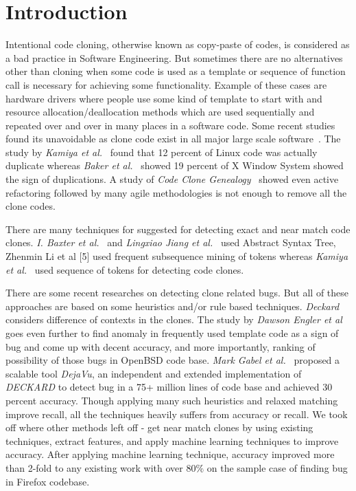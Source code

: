 \documentclass[nocopyrightspace]{sigplanconf}
\begin{document}
\section{Introduction}
Intentional code cloning, otherwise known as copy-paste of codes, is considered as a bad practice in Software Engineering. But sometimes there are no alternatives other than cloning when some code is used as a template or sequence of function call is necessary for achieving some functionality. Example of these cases are hardware drivers where people use some kind of template to start with and resource allocation/deallocation methods which are used sequentially and repeated over and over in many places in a software code. Some recent studies found its unavoidable as clone code exist in all major large scale software~\cite{Li2006, Kamiya2002,Baker1995}. The study by \emph{Kamiya et al.}~\cite{Kamiya2002} found that 12 percent of Linux code was actually duplicate whereas \emph{Baker et al.}~\cite{Baker1995} showed 19 percent of X Window System showed the sign of duplications. A study of \emph{Code Clone Genealogy}~\cite{Kim2005} showed even active refactoring followed by many agile methodologies is not enough to remove all the clone codes.

There are many techniques for suggested for detecting exact and near match code clones. \emph{I. Baxter et al.}~\cite{Baxter1998} and \emph{Lingxiao Jiang et al.}~\cite{Jiang2007} used Abstract Syntax Tree, Zhenmin Li et al [5] used frequent subsequence mining of tokens whereas \emph{Kamiya et al.}~\cite{Kamiya2002} used sequence of tokens for detecting code clones. 

There are some recent researches on detecting clone related bugs. But all of these approaches are based on some heuristics and/or rule based techniques. \emph{Deckard}~\cite{Jiang2007} considers difference of contexts in the clones. The study by \emph{Dawson Engler et al}~\cite{Engler2001} goes even further to find anomaly in frequently used template code as a sign of bug and come up with decent accuracy, and more importantly, ranking of possibility of those bugs in OpenBSD code base. \emph{Mark Gabel et al.}~\cite{Gabel2010} proposed a scalable tool \emph{DejaVu}, an independent and extended implementation of \emph{DECKARD} to detect bug in a 75+ million lines of code base and achieved 30 percent accuracy. Though applying many such heuristics and relaxed matching improve recall, all the techniques heavily suffers from accuracy or recall. We took off where other methods left off - get near match clones by using existing techniques, extract features, and apply machine learning techniques to improve accuracy. After applying machine learning technique, accuracy improved more than 2-fold to any existing work with over $80\%$ on the sample case of finding bug in Firefox codebase.
\end{document}
